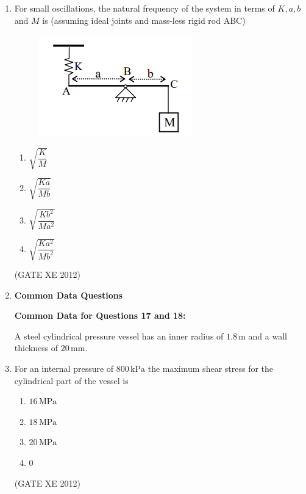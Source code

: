 \documentclass[12pt]{article}
\begin{document}
\begin{enumerate}
\begin{enumerate}
\item increases with $t$
\item remains independent of $t$
\item decreases with $t$
\item depends on the elastic properties
\end{enumerate}
(GATE XE 2012)

\item For small oscillations, the natural frequency of the system in terms of $K, a, b$ and $M$ is (assuming ideal joints and mass-less rigid rod ABC)

\begin{figure}[H]
    \centering
    \includegraphics[width=0.5\columnwidth]{figs/ass2_d_q16.png}
    \caption{}
    \label{fig:placeholder}
\end{figure}

\begin{multicols}{4}
\begin{enumerate}
\item $\sqrt{\dfrac{K}{M}}$
\item $\sqrt{\dfrac{Ka}{Mb}}$
\item $\sqrt{\dfrac{Kb^2}{Ma^2}}$
\item $\sqrt{\dfrac{Ka^2}{Mb^2}}$
\end{enumerate}
\end{multicols}
(GATE XE 2012)

\item[] {\large \textbf{Common Data Questions}}

\textbf{Common Data for Questions 17 and 18:}

A steel cylindrical pressure vessel has an inner radius of $1.8 \, \text{m}$ and a wall thickness of $20 \, \text{mm}$. 

\item For an internal pressure of $800 \, \text{kPa}$ the maximum shear stress for the cylindrical part of the vessel is  

\begin{multicols}{4}
\begin{enumerate}
\item $16 \, \text{MPa}$
\item $18 \, \text{MPa}$
\item $20 \, \text{MPa}$
\item $0$
\end{enumerate}
\end{multicols}
(GATE XE 2012)


\end{enumerate}
\end{document}
